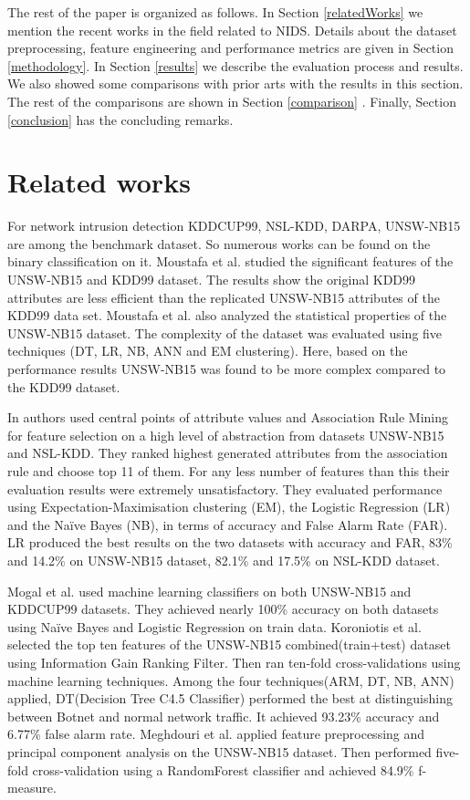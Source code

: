 \documentclass[14pt, conference]{IEEEtran}
\begin{document}
The rest of the paper is organized as follows. In Section \ref{relatedWorks} we mention the recent works in the field
related to NIDS. Details about the dataset preprocessing, feature engineering and performance metrics are given in
Section \ref{methodology}. In Section \ref{results} we describe the evaluation process and results. We also showed
some comparisons with prior arts with the results in this section. The rest of the comparisons are shown in Section
\ref{comparison} . Finally, Section \ref{conclusion} has the concluding remarks.


\section{Related works \label{relatedWorks}}
For network intrusion detection KDDCUP99, NSL-KDD, DARPA, UNSW-NB15 are among the benchmark dataset. So numerous
works can be found on the binary classification on it. Moustafa et al. \cite{moustafa2015significant} studied the
significant features of the UNSW-NB15 and KDD99 dataset. The results show the original KDD99 attributes are less
efficient than the replicated UNSW-NB15 attributes of the KDD99 data set.  Moustafa et al. \cite{moustafa2016evaluation}
also analyzed the statistical properties of the UNSW-NB15 dataset. The complexity of the dataset was  evaluated using
five techniques (DT, LR, NB, ANN and EM clustering). Here, based on the performance results UNSW-NB15 was found to be
more complex compared to the KDD99 dataset.

In \cite{moustafa2017hybrid} authors used central points of attribute values and Association Rule Mining for feature
selection on a high level of abstraction from datasets UNSW-NB15 and NSL-KDD. They ranked highest generated attributes
from the association rule and choose top 11 of them. For any less number of features than this their evaluation
results were extremely unsatisfactory. They evaluated performance using Expectation-Maximisation clustering (EM),
the Logistic Regression (LR) and the Naïve Bayes (NB), in terms of accuracy and False Alarm Rate (FAR). LR produced
the best results on the two datasets with accuracy and FAR, 83\% and 14.2\% on UNSW-NB15 dataset, 82.1\% and 17.5\% on
NSL-KDD dataset.


Mogal et al. \cite{mogal2017nids} used machine learning classifiers on both UNSW-NB15 and KDDCUP99 datasets.
They achieved nearly 100\% accuracy on both datasets using Naïve Bayes and Logistic Regression on train data.
Koroniotis et al.\cite{koroniotis2017towards} selected the top ten features of the UNSW-NB15 combined(train+test)
dataset using Information Gain Ranking Filter. Then ran ten-fold cross-validations using machine learning techniques.
Among the four techniques(ARM, DT, NB, ANN) applied, DT(Decision Tree C4.5 Classifier) performed the best at
 distinguishing between Botnet and normal network traffic. It achieved 93.23\% accuracy and 6.77\% false alarm rate.
 Meghdouri et al. \cite{meghdouri2018analysis} applied feature preprocessing and principal component analysis on the
 UNSW-NB15 dataset. Then performed five-fold cross-validation using a RandomForest classifier and achieved 84.9\%
 f-measure.
\end{document}

